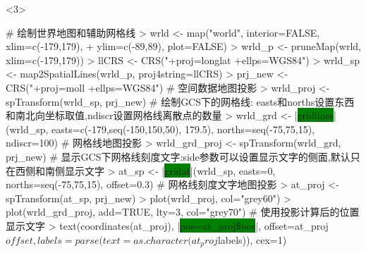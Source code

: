 \begin{frame}[t,fragile]{\subsecname}{\subsubsecname}
\begin{overlayarea}{\textwidth}{\textheight}
\begin{onlyenv}<3>
\begin{rcode}
# 绘制世界地图和辅助网格线
> wrld <- map("world", interior=FALSE, xlim=c(-179,179), 
+    ylim=c(-89,89), plot=FALSE)
> wrld_p <- pruneMap(wrld, xlim=c(-179,179))
> llCRS <- CRS("+proj=longlat +ellps=WGS84")
> wrld_sp <- map2SpatialLines(wrld_p, proj4string=llCRS)
> prj_new <- CRS("+proj=moll +ellps=WGS84")
# 空间数据地图投影
> wrld_proj <- spTransform(wrld_sp, prj_new)
# 绘制GCS下的网格线: easts和norths设置东西和南北向坐标取值,ndiscr设置网格线离散点的数量
> wrld_grd <- |\colorbox{green}{gridlines}|(wrld_sp, easts=c(-179,seq(-150,150,50), 179.5),        norths=seq(-75,75,15), ndiscr=100)
# 网格线地图投影
> wrld_grd_proj <- spTransform(wrld_grd, prj_new)
# 显示GCS下网格线刻度文字:side参数可以设置显示文字的侧面,默认只在西侧和南侧显示文字
> at_sp <- |\colorbox{green}{gridat}|(wrld_sp, easts=0, norths=seq(-75,75,15), offset=0.3)
# 网格线刻度文字地图投影
> at_proj <- spTransform(at_sp, prj_new)
> plot(wrld_proj, col="grey60")
> plot(wrld_grd_proj, add=TRUE, lty=3, col="grey70")
# 使用投影计算后的位置显示文字
> text(coordinates(at_proj), |\colorbox{green}{pos=at\_proj\$pos}|, offset=at_proj$offset,labels=parse(text=as.character(at_proj$labels)), cex=1)
\end{rcode}
\end{onlyenv}

\end{overlayarea}
\end{frame}

